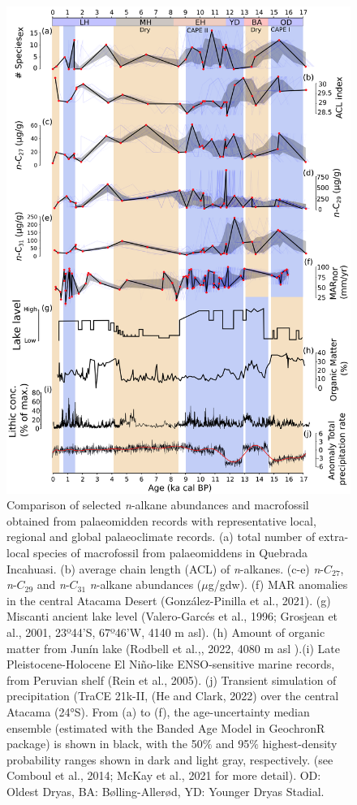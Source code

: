 \documentclass[
  authoryear,
  preprint,
  3p]{elsarticle}
\begin{document}
\newpage{}

\begin{figure}

{\centering \includegraphics{Fig_5.png}

}

\caption{\label{fig-5}Comparison of selected \emph{n}-alkane abundances
and macrofossil obtained from palaeomidden records with representative
local, regional and global palaeoclimate records. (a) total number of
extra-local species of macrofossil from palaeomiddens in Quebrada
Incahuasi. (b) average chain length (ACL) of \emph{n}-alkanes. (c-e)
\emph{n}-\(C_{27}\), \emph{n}-\(C_{29}\) and \emph{n}-\(C_{31}\)
\emph{n}-alkane abundances (\(\mu\)g/gdw). (f) MAR anomalies in the
central Atacama Desert (González-Pinilla et al., 2021). (g) Miscanti
ancient lake level (Valero-Garcés et al., 1996; Grosjean et al., 2001,
23º44'S, 67º46'W, 4140 m asl). (h) Amount of organic matter from Junín
lake (Rodbell et al.,, 2022, 4080 m asl ).(i) Late Pleistocene-Holocene
El Niño-like ENSO-sensitive marine records, from Peruvian shelf (Rein et
al., 2005). (j) Transient simulation of precipitation (TraCE 21k-II, (He
and Clark, 2022) over the central Atacama (24°S). From (a) to (f), the
age-uncertainty median ensemble (estimated with the Banded Age Model in
GeochronR package) is shown in black, with the 50\(\%\) and 95\(\%\)
highest-density probability ranges shown in dark and light gray,
respectively. (see Comboul et al., 2014; McKay et al., 2021 for more
detail). OD: Oldest Dryas, BA: Bølling-Allerød, YD: Younger Dryas
Stadial.}


\end{figure}
\end{document}
